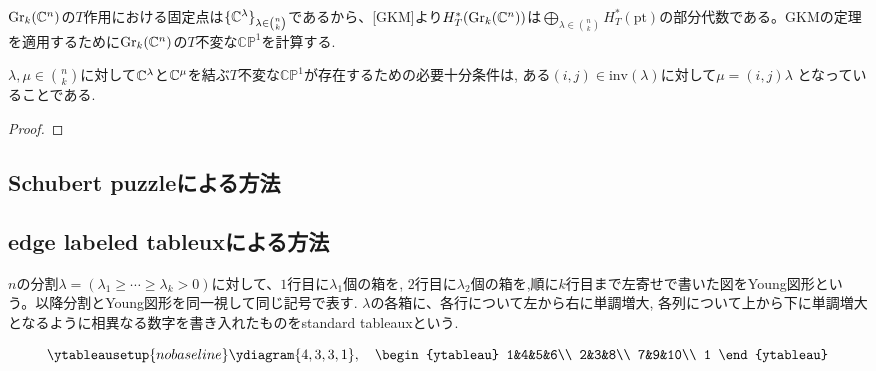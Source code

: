 $\text{Gr}_k(\mathbb{C}^n)$の$T$作用における固定点は$\{\mathbb{C}^\lambda\}_{\lambda\in\binom{n}{k}}$であるから、[GKM]より$H^*_T(\text{Gr}_k(\mathbb{C}^n))$は$\bigoplus_{\lambda\in\binom{n}{k}}H^*_T(\text{pt})$の部分代数である。GKMの定理を適用するために$\text{Gr}_k(\mathbb{C}^n)$の$T$不変な$\mathbb{CP}^1$を計算する.

\begin{prop}
  $\lambda,\mu\in\binom{n}{k}$に対して$\mathbb{C}^\lambda$と$\mathbb{C}^\mu$を結ぶ$T$不変な$\mathbb{CP}^1$が存在するための必要十分条件は, ある$(i, j)\in\text{inv}(\lambda)$に対して$\mu = (i, j)\lambda$
  となっていることである.
\end{prop}

\begin{proof}
  
\end{proof}




\subsection{Schubert puzzleによる方法}


\subsection{edge labeled tableuxによる方法}

\begin{defin}
  $n$の分割$\lambda=(\lambda_1\geq\cdots\geq\lambda_k>0)$に対して、$1$行目に$\lambda_1$個の箱を, $2$行目に$\lambda_2$個の箱を,順に$k$行目まで左寄せで書いた図をYoung図形という。以降分割とYoung図形を同一視して同じ記号で表す. $\lambda$の各箱に、各行について左から右に単調増大, 各列について上から下に単調増大となるように相異なる数字を書き入れたものをstandard tableauxという. 

\[
\ytableausetup{nobaseline}
\ydiagram{4, 3, 3, 1},
\quad\begin{ytableau}
    1&4&5&6\\
    2&3&8\\
    7&9&10\\
    1
\end{ytableau}
\]

\end{defin}

